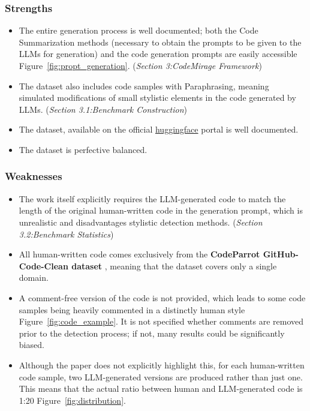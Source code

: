 \subsubsection*{Strengths}
\begin{itemize}
    \item The entire generation process is well documented; both 
    the Code Summarization methods 
    (necessary to obtain the prompts to be given to 
    the LLMs for generation) and the code 
    generation prompts are easily accessible 
    Figure~\ref{fig:propt_generation}. 
    {(\scriptsize\textit{Section 3:CodeMirage Framework})}
    \item The dataset also includes code samples with Paraphrasing, 
    meaning simulated modifications of small stylistic elements 
    in the code generated by LLMs.
    {(\scriptsize\textit{Section 3.1:Benchmark Construction})}
    \item The dataset, available on the official 
    \href{{https://huggingface.co/datasets/HanxiGuo/CodeMirage}}{huggingface} 
    portal is well documented.
    \item The dataset is perfective balanced.
\end{itemize}



\subsubsection*{Weaknesses}
\begin{itemize}
    \item The work itself explicitly requires the LLM-generated 
    code to match the length of the original human-written 
    code in the generation prompt, which is unrealistic and 
    disadvantages stylistic detection methods.
    {(\scriptsize\textit{Section 3.2:Benchmark Statistics})}
    \item All human-written code comes exclusively from the 
    \textbf{CodeParrot GitHub-Code-Clean dataset} 
    \cite{codeparrot-github-code-clean-2022}, 
    meaning that the dataset covers only a single domain.
    \item A comment-free version of the code is not provided, 
    which leads to some code samples being heavily 
    commented in a distinctly human style
    Figure~\ref{fig:code_example}. 
    It is not specified whether comments are removed prior to the 
    detection process; if not, many results could be 
    significantly biased.
    \item Although the paper does not explicitly highlight this, for each 
    human-written code sample, two LLM-generated versions are produced 
    rather than just one. This means that the actual ratio between human 
    and LLM-generated code is 1:20 Figure~\ref{fig:distribution}. 
\end{itemize}



